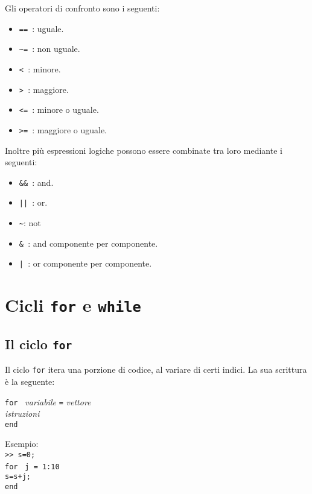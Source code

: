 \documentclass[12pt,a4paper,oneside]{book}
\begin{document}
Gli operatori di confronto sono i seguenti:
\begin{itemize}

	\item	\texttt{== }: uguale.
	\item	\texttt{\textasciitilde= }: non uguale.
	\item	\texttt{< }: minore.
	\item	\texttt{> }: maggiore.
	\item	\texttt{<= }: minore o uguale.
	\item 	\texttt{>= }: maggiore o uguale.

\end{itemize}

Inoltre più espressioni logiche possono essere combinate tra loro mediante i seguenti:
\begin{itemize}

	\item	\texttt{\&\& }: and.
	\item	\texttt{|| }: or.
	\item	\texttt{\textasciitilde }: not
	\item	\texttt{\& }: and componente per componente.
	\item	\texttt{| }: or componente per componente.

\end{itemize}


\section{Cicli \texttt{for} e \texttt{while}}
\subsection{Il ciclo \texttt{for}}
Il ciclo \texttt{for} itera una porzione di codice, al variare di certi indici. La sua scrittura è la seguente:
\begin{center}
\texttt{for } \textit{variabile} \texttt{=} \textit{vettore} \\ 
\hspace{1.5cm}\textit{istruzioni}  \\
\hspace{-3.5cm}\texttt{end}
\end{center}

Esempio: \\
\texttt{>> s=0;} \\
\texttt{for } \texttt{j = 1:10} \\ 
\hspace{1cm}\texttt{s=s+j;}  \\
\texttt{end}
\end{document}
